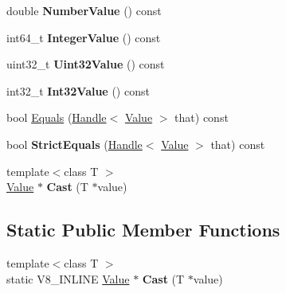 \begin{DoxyCompactItemize}
\item 
\hypertarget{classv8_1_1_value_a4634d525bae654cdc50c398bfaee11aa}{}double {\bfseries Number\+Value} () const \label{classv8_1_1_value_a4634d525bae654cdc50c398bfaee11aa}

\item 
\hypertarget{classv8_1_1_value_ac61c74a94dea10f48a64f5906b6dd43d}{}int64\+\_\+t {\bfseries Integer\+Value} () const \label{classv8_1_1_value_ac61c74a94dea10f48a64f5906b6dd43d}

\item 
\hypertarget{classv8_1_1_value_af25557359e6bb79436ed60df18703d66}{}uint32\+\_\+t {\bfseries Uint32\+Value} () const \label{classv8_1_1_value_af25557359e6bb79436ed60df18703d66}

\item 
\hypertarget{classv8_1_1_value_a24daae9d99d02ff2e24b60287dcd4d95}{}int32\+\_\+t {\bfseries Int32\+Value} () const \label{classv8_1_1_value_a24daae9d99d02ff2e24b60287dcd4d95}

\item 
bool \hyperlink{classv8_1_1_value_adc2a7a92a120675bbd4c992163a20869}{Equals} (\hyperlink{classv8_1_1_handle}{Handle}$<$ \hyperlink{classv8_1_1_value}{Value} $>$ that) const 
\item 
\hypertarget{classv8_1_1_value_abb564818715b818957adc97716a076ba}{}bool {\bfseries Strict\+Equals} (\hyperlink{classv8_1_1_handle}{Handle}$<$ \hyperlink{classv8_1_1_value}{Value} $>$ that) const \label{classv8_1_1_value_abb564818715b818957adc97716a076ba}

\item 
\hypertarget{classv8_1_1_value_ac2142bb3ec6527633c4f9133e80cdc19}{}{\footnotesize template$<$class T $>$ }\\\hyperlink{classv8_1_1_value}{Value} $\ast$ {\bfseries Cast} (T $\ast$value)\label{classv8_1_1_value_ac2142bb3ec6527633c4f9133e80cdc19}

\end{DoxyCompactItemize}
\subsection*{Static Public Member Functions}
\begin{DoxyCompactItemize}
\item 
\hypertarget{classv8_1_1_value_ae5aa9b54ebed55819c3a4b2a3eb5fe12}{}{\footnotesize template$<$class T $>$ }\\static V8\+\_\+\+I\+N\+L\+I\+N\+E \hyperlink{classv8_1_1_value}{Value} $\ast$ {\bfseries Cast} (T $\ast$value)\label{classv8_1_1_value_ae5aa9b54ebed55819c3a4b2a3eb5fe12}

\end{DoxyCompactItemize}


